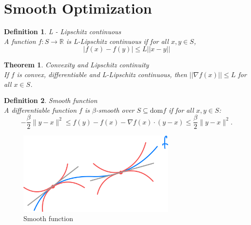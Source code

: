 \documentclass[11pt]{book} %
\newtheorem{theorem}{Theorem}[section]
\newtheorem{definition}{Definition}[section]
\begin{document}


\section{Smooth Optimization}

\begin{definition}{L - Lipschitz continuous} \\
A function $f: S \rightarrow \mathbb{R}$ is L-Lipschitz continuous if for all $x, y \in S$,
\begin{equation}
    |f(x) - f(y)| \leq L ||x-y||
\end{equation}    
\end{definition}

\begin{theorem}{Convexity and Lipschitz continuity} \\
If $f$ is convex, differentiable and L-Lipschitz continuous, then $||\nabla f(x)|| \leq L$ for all $x \in S$. 
\end{theorem}

\begin{definition} {Smooth function} \\
    A differentiable function \( f \) is \(\beta\)-smooth over \( S \subseteq \text{dom} f \) if for all \( x, y \in S \):
    \[-\frac{\beta}{2} \|y - x\|^2 \leq f(y) - f(x) - \nabla f(x) \cdot (y - x) \leq \frac{\beta}{2} \|y - x\|^2.\]
\end{definition}


\begin{figure}[H]
    \centering
    \includegraphics[width=0.7\textwidth]{Figs/beta_smooth_function.png}
    \caption{Smooth function}
\end{figure}
\end{document}
